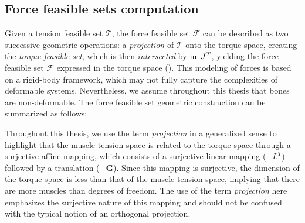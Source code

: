\subsection{Force feasible sets computation}
Given a tension feasible set $\mathcal{T}$, the force feasible set $\mathcal{F}$ can be described as two successive geometric operations: a \emph{projection} of $\mathcal{T}$ onto the torque space, creating the \emph{torque feasible set}, which is then \emph{intersected} by $\operatorname{im}{J^T}$, yielding the force feasible set $\mathcal{F}$ expressed in the torque space (\cite{skuricCoupledViewPhysical}). This modeling of forces is based on a rigid-body framework, which may not fully capture the complexities of deformable systems. Nevertheless, we assume throughout this thesis that bones are non-deformable. The force feasible set geometric construction can be summarized as follows:
\begin{figure}[!ht]
    \centering
    \captionsetup{justification=centering}
\end{figure}

Throughout this thesis, we use the term \emph{projection} in a generalized sense to highlight that the muscle tension space is related to the torque space through a surjective affine mapping, which consists of a surjective linear mapping ($-L^T$) followed by a translation ($-\mathbf{G}$). 
Since this mapping is surjective, the dimension of the torque space is less than that of the muscle tension space, implying that there are more muscles than degrees of freedom. The use of the term \emph{projection} here emphasizes the surjective nature of this mapping and should not be confused with the typical notion of an orthogonal projection.

